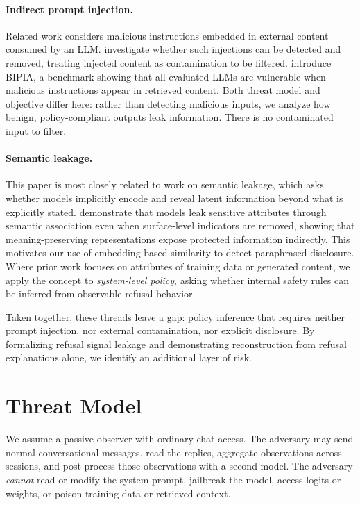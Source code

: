 \documentclass[10pt,letterpaper,twocolumn]{article}
\begin{document}
\paragraph{Indirect prompt injection.} Related work considers malicious
instructions embedded in external content consumed by an LLM.
\citet{chen2025indirect} investigate whether such injections can be detected and
removed, treating injected content as contamination to be filtered.
\citet{yi2025benchmarking} introduce BIPIA, a benchmark showing that all
evaluated LLMs are vulnerable when malicious instructions appear in retrieved
content. Both threat model and objective differ here: rather than detecting
malicious inputs, we analyze how benign, policy-compliant outputs leak
information. There is no contaminated input to filter.

\paragraph{Semantic leakage.} This paper is most closely related to work on
semantic leakage, which asks whether models implicitly encode and reveal latent
information beyond what is explicitly stated. \citet{gonen2025semantic}
demonstrate that models leak sensitive attributes through semantic association
even when surface-level indicators are removed, showing that meaning-preserving
representations expose protected information indirectly. This motivates our use
of embedding-based similarity to detect paraphrased disclosure. Where prior work
focuses on attributes of training data or generated content, we apply the concept
to \emph{system-level policy}, asking whether internal safety rules can be
inferred from observable refusal behavior.

Taken together, these threads leave a gap: policy inference that requires neither
prompt injection, nor external contamination, nor explicit disclosure. By
formalizing refusal signal leakage and demonstrating reconstruction from refusal
explanations alone, we identify an additional layer of risk.

\section{Threat Model}
\label{sec:threat}

We assume a passive observer with ordinary chat access. The adversary may send
normal conversational messages, read the replies, aggregate observations across
sessions, and post-process those observations with a second model. The adversary
\emph{cannot} read or modify the system prompt, jailbreak the model, access
logits or weights, or poison training data or retrieved context.
\end{document}
